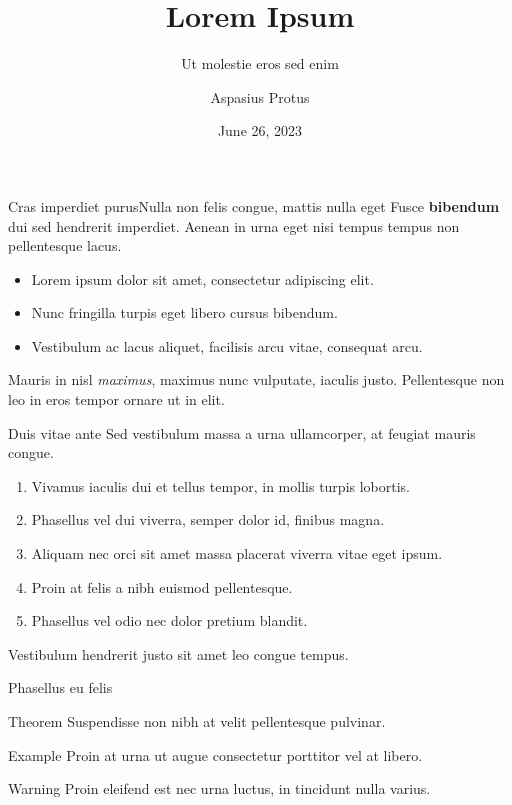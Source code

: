\title{Lorem Ipsum}
\subtitle{Ut molestie eros sed enim}
\author{Aspasius Protus}
\date{June 26, 2023} 

\frame[plain]{\maketitle} 

\begin{frame}{Cras imperdiet purus}{Nulla non felis congue, mattis nulla eget}
  Fusce \textbf{bibendum} dui sed hendrerit imperdiet.
  Aenean in urna eget nisi tempus tempus non pellentesque lacus.
  \begin{itemize}
    \item Lorem ipsum dolor sit amet, consectetur adipiscing elit.
    \item Nunc fringilla turpis eget libero cursus bibendum.
    \item Vestibulum ac lacus aliquet, facilisis arcu vitae, consequat arcu.
  \end{itemize}
  Mauris in nisl \textit{maximus}, maximus nunc vulputate, iaculis justo.
  Pellentesque non leo in eros tempor ornare ut in elit.
\end{frame}

\begin{frame}{Duis vitae ante}
  Sed \alert{vestibulum} massa a urna ullamcorper, at feugiat mauris congue.
  \begin{enumerate}
    \item Vivamus iaculis dui et tellus tempor, in mollis turpis lobortis.
    \item Phasellus vel dui viverra, semper dolor id, finibus magna.
    \item Aliquam nec orci sit amet massa placerat viverra vitae eget ipsum.
    \item Proin at felis a nibh euismod pellentesque.
    \item Phasellus vel odio nec dolor pretium blandit.
  \end{enumerate}
  Vestibulum hendrerit justo sit amet leo congue tempus.
\end{frame}

\begin{frame}{Phasellus eu felis}
  
  \begin{block}{Theorem}
    Suspendisse non nibh at velit pellentesque pulvinar.
  \end{block}

  \begin{exampleblock}{Example}
    Proin at urna ut augue consectetur porttitor vel at libero.
  \end{exampleblock}

  \begin{alertblock}{Warning}
    Proin eleifend est nec urna luctus, in tincidunt nulla varius.
  \end{alertblock}
\end{frame}

